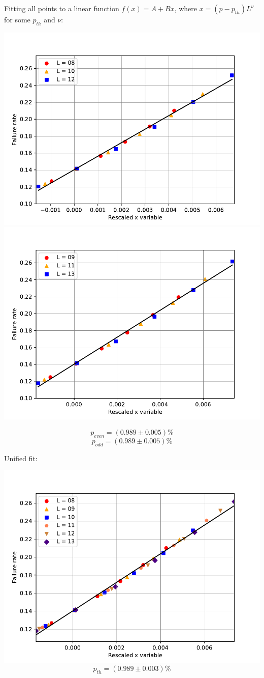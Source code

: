 \documentclass[pra]{revtex4-1}
\begin{document}
\noindent Fitting all points to a linear function $f(x) = A + Bx$, where $x=(p-p_{th})L^{\nu}$ for some $p_{th}$ and $\nu$: 
  
\includegraphics[width=.49\textwidth]{../graphs-paper2/unj-dephasing-even-rescaled.pdf}
\includegraphics[width=.49\textwidth]{../graphs-paper2/unj-dephasing-odd-rescaled.pdf}

\[  p_{even} = (0.989 \pm 0.005)\% \]
\[  p_{odd} = (0.989 \pm 0.005)\% \]
\clearpage 

Unified fit: \begin{center} 

\includegraphics[width=.9\textwidth]{../graphs-paper2/unj-dephasing-rescaled.pdf}
\[  p_{th} = (0.989 \pm 0.003)\% \] \end{center}
\clearpage 
\end{document}
